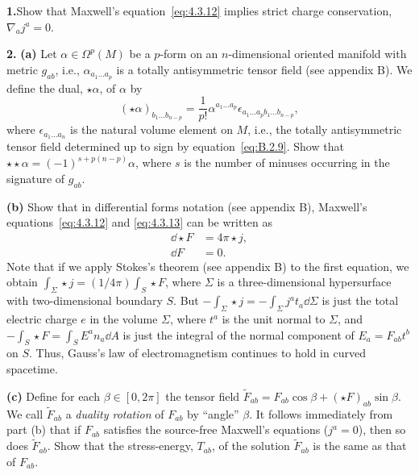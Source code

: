 
\chapterproblems

\noindent\textbf{1.}\label{prob:4.1}\quad Show that Maxwell's
equation~\eqref{eq:4.3.12} implies strict charge conservation,
\(\nabla_aj^a=0\).

\medskip
\noindent\textbf{2.}\label{prob:4.2}\quad
\textbf{(a)} Let \(\alpha\in\Omega^p(M)\) be a \(p\)-form on an
\(n\)-dimensional oriented manifold with metric \(g_{ab}\), i.e.,
\(\alpha_{a_1\dots a_p}\) is a totally antisymmetric tensor field (see appendix B).
We define the dual, \(\star\alpha\), of \(\alpha\) by
\begin{equation*}
  (\star\alpha)_{b_1\dots b_{n-p}}
    =\frac{1}{p!}\alpha^{a_1\dots a_p}
      \epsilon_{a_1\dots a_pb_1\dots b_{n-p}} ,
\end{equation*}
where \(\epsilon_{a_1\dots a_n}\) is the natural volume element on \(M\), i.e.,
the totally antisymmetric tensor field determined up to sign by
equation~\eqref{eq:B.2.9}. Show that
\(\star\star\alpha=(-1)^{s+p(n-p)}\alpha\), where \(s\) is the number of minuses
occurring in the signature of \(g_{ab}\).

\noindent\textbf{(b)} Show that in differential forms notation (see appendix B),
Maxwell's equations~\eqref{eq:4.3.12} and \eqref{eq:4.3.13} can be written as
\begin{align*}
  \dd\star F&=4\pi\star j ,\\
  \dd F&=0 .
\end{align*}
Note that if we apply Stokes's theorem (see appendix B) to the first equation, we
obtain \(\int_\Sigma\star j=(1/4\pi)\int_S\star F\), where \(\Sigma\) is a
three-dimensional hypersurface with two-dimensional boundary \(S\). But
\(-\int_\Sigma\star j=-\int_\Sigma j^at_a\dd\Sigma\) is just the total electric
charge \(e\) in the volume \(\Sigma\), where \(t^a\) is the unit normal to
\(\Sigma\), and \(-\int_S\star F=\int_S E^an_a\dd A\) is just the integral of the
normal component of \(E_a=F_{ab}t^b\) on \(S\). Thus, Gauss's law of
electromagnetism continues to hold in curved spacetime.

\noindent\textbf{(c)} Define for each \(\beta\in[0,2\pi]\) the tensor field
\(\widetilde F_{ab}=F_{ab}\cos\beta+(\star F)_{ab}\sin\beta\). We call
\(\widetilde F_{ab}\) a \emph{duality rotation} of \(F_{ab}\) by ``angle''
\(\beta\). It follows immediately from part (b) that if \(F_{ab}\) satisfies the
source-free Maxwell's equations (\(j^a=0\)), then so does \(\widetilde F_{ab}\).
Show that the stress-energy, \(T_{ab}\), of the solution \(\widetilde F_{ab}\) is the
same as that of \(F_{ab}\).

